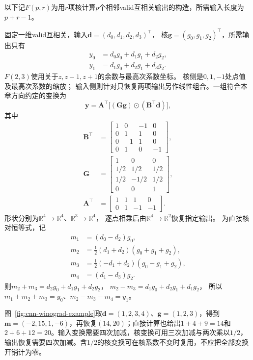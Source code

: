 以下记$F(p,r)$为用$r$项核计算$p$个相邻valid互相关输出的构造，所需输入长度为$p+r-1$。

\begin{example}
  \label{ex:signal-analysis-winograd-f23}
  固定一维valid互相关，输入$\bm d=(d_0,d_1,d_2,d_3)^\top$，
  核$\bm g=(g_0,g_1,g_2)^\top$，所需输出只有
  \begin{align*}
    y_0&=d_0g_0+d_1g_1+d_2g_2,\\
    y_1&=d_1g_0+d_2g_1+d_3g_2.
  \end{align*}
  $F(2,3)$使用关于$z,z-1,z+1$的余数与最高次系数坐标。
  核侧是$0,1,-1$处点值及最高次系数的缩放；
  输入侧则针对只恢复两项输出另作线性组合。一组符合本章方向约定的变换为
  \begin{equation}
    \bm y=\bm A^\top\bigl[(\bm G\bm g)\odot(\bm B^\top\bm d)\bigr],
    \label{eq:signal-analysis-winograd-f23}
  \end{equation}
\BookEquationAliases{\label{eq:cnn-winograd-matrix-a}
\label{eq:cnn-winograd-matrices-bg}
\label{eq:cnn-winograd-recovery-principle}
\label{eq:cnn-winograd-one-dimensional}
\label{eq:cnn-winograd-vector-transform}}
  其中
  \begin{align*}
    \bm B^\top&=\begin{bmatrix}
      1&0&-1&0\\0&1&1&0\\0&-1&1&0\\0&1&0&-1
    \end{bmatrix},\\
    \bm G&=\begin{bmatrix}
      1&0&0\\1/2&1/2&1/2\\1/2&-1/2&1/2\\0&0&1
    \end{bmatrix},\\
    \bm A^\top&=\begin{bmatrix}1&1&1&0\\0&1&-1&-1\end{bmatrix}.
  \end{align*}
  形状分别为$\mathbb R^4\to\mathbb R^4$、$\mathbb R^3\to\mathbb R^4$，
  逐点相乘后由$\mathbb R^4\to\mathbb R^2$恢复指定输出。
  为直接核对恒等式，记
  \begin{align*}
    m_1&=(d_0-d_2)g_0,\\
    m_2&=\tfrac12(d_1+d_2)(g_0+g_1+g_2),\\
    m_3&=\tfrac12(-d_1+d_2)(g_0-g_1+g_2),\\
    m_4&=(d_1-d_3)g_2.
  \end{align*}
  则$m_2+m_3=d_2g_0+d_1g_1+d_2g_2$，
  $m_2-m_3=d_1g_0+d_2g_1+d_1g_2$，
  所以$m_1+m_2+m_3=y_0$、$m_2-m_3-m_4=y_1$。

图~\ref{fig:cnn-winograd-example}取$\bm d=(1,2,3,4)$、$\bm g=(1,2,3)$，得到$\bm m=(-2,15,1,-6)$，再恢复$(14,20)$；直接计算也给出$1+4+9=14$和$2+6+12=20$。输入变换需要四次加减，核变换可用三次加减与两次乘以$1/2$，输出恢复需要四次加减。含$1/2$的核变换可在核系数不变时复用，不应把全部变换开销计为零。


\end{example}

